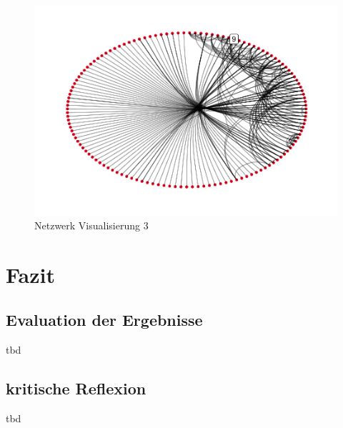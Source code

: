 \documentclass[
  12 pt,
]{article}
\begin{document}
\begin{figure}
\centering
\includegraphics{Assignment_files/figure-latex/unnamed-chunk-4-1.pdf}
\caption{Netzwerk Visualisierung 3}
\end{figure}

\newpage

\hypertarget{fazit}{%
\section{Fazit}\label{fazit}}

\hypertarget{evaluation-der-ergebnisse}{%
\subsection{Evaluation der Ergebnisse}\label{evaluation-der-ergebnisse}}

tbd

\hypertarget{kritische-reflexion}{%
\subsection{kritische Reflexion}\label{kritische-reflexion}}

tbd
\end{document}
